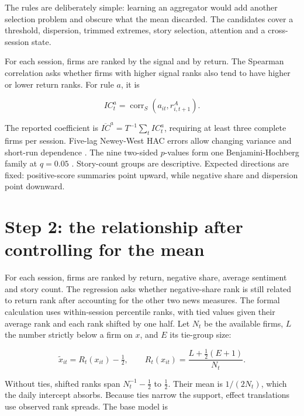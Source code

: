 The rules are deliberately simple: learning an aggregator would add another
selection problem and obscure what the mean discarded. The candidates cover a
threshold, dispersion, trimmed extremes, story selection, attention and a
cross-session state.

For each session, firms are ranked by the signal and by return. The Spearman
correlation asks whether firms with higher signal ranks also tend to have higher
or lower return ranks. For rule $a$, it is

\begin{equation}
 IC^a_t=\operatorname{corr}_{S}\left(a_{it},r^A_{i,t+1}\right).
 \label{eq:daily-ic}
\end{equation}

The reported coefficient is $\overline{IC}^a=T^{-1}\sum_t IC^a_t$, requiring at
least three complete firms per session. Five-lag Newey-West HAC errors allow
changing variance and short-run dependence \citep{newey1987}. The nine two-sided
$p$-values form one Benjamini-Hochberg family at $q=0.05$
\citep{benjamini1995}. Story-count groups are descriptive. Expected directions
are fixed: positive-score summaries point upward, while negative share and
dispersion point downward.

\section{Step 2: the relationship after controlling for the mean}

For each session, firms are ranked by return, negative share, average sentiment
and story count. The regression asks whether negative-share rank is still
related to return rank after accounting for the other two news measures. The
formal calculation uses within-session percentile ranks, with tied values given
their average rank and each rank shifted by one half. Let $N_t$ be the available
firms, $L$ the number strictly below a firm on $x$, and $E$ its tie-group size:

\begin{equation}
 \widetilde x_{it}=R_t(x_{it})-\tfrac12,
 \qquad
 R_t(x_{it})=\frac{L+\tfrac12(E+1)}{N_t}.
 \label{eq:shifted-rank}
\end{equation}

\noindent Without ties, shifted ranks span $N_t^{-1}-\tfrac12$ to $\tfrac12$.
Their mean is $1/(2N_t)$, which the daily intercept absorbs. Because ties narrow
the support, effect translations use observed rank spreads. The base model is

